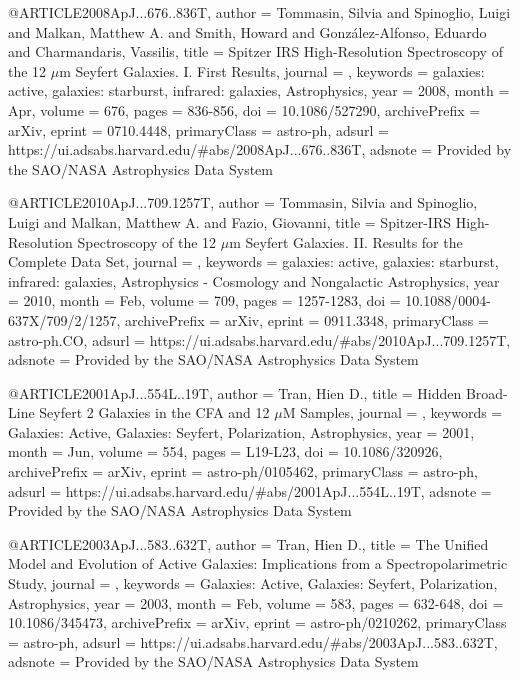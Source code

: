 \documentclass[longauth]{aa}
\begin{document}
{{{{@ARTICLE{2008ApJ...676..836T,
       author = {{Tommasin}, Silvia and {Spinoglio}, Luigi and {Malkan}, Matthew A. and {Smith}, Howard and {Gonz{\'a}lez-Alfonso}, Eduardo and {Charmandaris}, Vassilis},
        title = {Spitzer IRS High-Resolution Spectroscopy of the 12 {\ensuremath{\mu}}m Seyfert Galaxies. I. First Results},
      journal = {\apj},
     keywords = {galaxies: active, galaxies: starburst, infrared: galaxies, Astrophysics},
         year = 2008,
        month = Apr,
       volume = {676},
        pages = {836-856},
          doi = {10.1086/527290},
archivePrefix = {arXiv},
       eprint = {0710.4448},
 primaryClass = {astro-ph},
       adsurl = {https://ui.adsabs.harvard.edu/#abs/2008ApJ...676..836T},
      adsnote = {Provided by the SAO/NASA Astrophysics Data System}
}

@ARTICLE{2010ApJ...709.1257T,
       author = {{Tommasin}, Silvia and {Spinoglio}, Luigi and {Malkan}, Matthew A. and {Fazio}, Giovanni},
        title = {Spitzer-IRS High-Resolution Spectroscopy of the 12 {\ensuremath{\mu}}m Seyfert Galaxies. II. Results for the Complete Data Set},
      journal = {\apj},
     keywords = {galaxies: active, galaxies: starburst, infrared: galaxies, Astrophysics - Cosmology and Nongalactic Astrophysics},
         year = 2010,
        month = Feb,
       volume = {709},
        pages = {1257-1283},
          doi = {10.1088/0004-637X/709/2/1257},
archivePrefix = {arXiv},
       eprint = {0911.3348},
 primaryClass = {astro-ph.CO},
       adsurl = {https://ui.adsabs.harvard.edu/#abs/2010ApJ...709.1257T},
      adsnote = {Provided by the SAO/NASA Astrophysics Data System}
}

@ARTICLE{2001ApJ...554L..19T,
       author = {{Tran}, Hien D.},
        title = {Hidden Broad-Line Seyfert 2 Galaxies in the CFA and 12 {\ensuremath{\mu}}M Samples},
      journal = {\apj},
     keywords = {Galaxies: Active, Galaxies: Seyfert, Polarization, Astrophysics},
         year = 2001,
        month = Jun,
       volume = {554},
        pages = {L19-L23},
          doi = {10.1086/320926},
archivePrefix = {arXiv},
       eprint = {astro-ph/0105462},
 primaryClass = {astro-ph},
       adsurl = {https://ui.adsabs.harvard.edu/#abs/2001ApJ...554L..19T},
      adsnote = {Provided by the SAO/NASA Astrophysics Data System}
}

@ARTICLE{2003ApJ...583..632T,
       author = {{Tran}, Hien D.},
        title = {The Unified Model and Evolution of Active Galaxies: Implications from a Spectropolarimetric Study},
      journal = {\apj},
     keywords = {Galaxies: Active, Galaxies: Seyfert, Polarization, Astrophysics},
         year = 2003,
        month = Feb,
       volume = {583},
        pages = {632-648},
          doi = {10.1086/345473},
archivePrefix = {arXiv},
       eprint = {astro-ph/0210262},
 primaryClass = {astro-ph},
       adsurl = {https://ui.adsabs.harvard.edu/#abs/2003ApJ...583..632T},
      adsnote = {Provided by the SAO/NASA Astrophysics Data System}
}

}}}}
\end{document}
